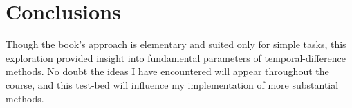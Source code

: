 \documentclass{article}
\begin{document}
	
	\section{Conclusions}

	Though the book's approach is elementary and suited only for simple tasks, this exploration provided insight into fundamental parameters of temporal-difference methods. No doubt the ideas I have encountered will appear throughout the course, and this test-bed will influence my implementation of more substantial methods.
	
	
\end{document}
